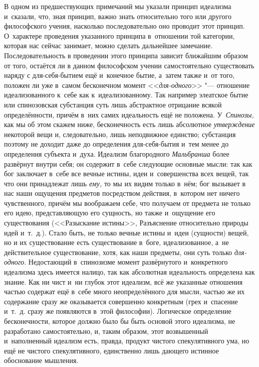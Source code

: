 В одном из предшествующих примечаний мы указали принцип идеализма и~сказали,
что, зная принцип, важно знать относительно того или другого философского
учения, насколько последовательно оно проводит этот принцип. О~характере
проведения указанного принципа в~отношении той категории, которая нас
сейчас занимает, можно сделать дальнейшее замечание. Последовательность в
проведении этого принципа зависит ближайшим образом от того, остаётся ли в
данном философском учении самостоятельно существовать наряду с
для-себя-бытием ещё и~конечное бытие, а~затем также и~от того, положен ли
уже в~самом бесконечном момент <<{\em для-одного}>>
"--- отношение идеализованного к~себе как к~идеализованному. Так например
элеатское бытие или спинозовская субстанция суть лишь абстрактное отрицание
всякой определённости, причём в~них самих идеальность ещё не положена.
У~{\em Спинозы,} как мы об этом скажем ниже,
бесконечность есть лишь абсолютное {\em утверждение}
некоторой вещи и, следовательно, лишь неподвижное единство; субстанция
поэтому не доходит даже до определения для-себя-бытия и~тем менее до
определения субъекта и~духа. Идеализм благородного
{\em Мальбранша} более развёрнут внутри себя; он
содержит в~себе следующие основные мысли: так как бог заключает в~себе все
вечные истины, идеи и~совершенства всех вещей, так что они принадлежат лишь
{\em ему,} то мы их видим только в~нём; бог вызывает в
нас наши ощущения предметов посредством действия, в~котором нет ничего
чувственного, причём мы воображаем себе, что получаем от предмета не только
его идею, представляющую его сущность, но также и~ощущение его
существования (<<Разыскание истины>>, Разъяснение относительно природы идей
и~т.~д.). Стало быть, не только вечные истины и~идеи (сущности) вещей, но и
их существование есть существование в~боге, идеализованное, а~не
действительное существование, хотя, как наши предметы, они суть только
{\em для-одного}. Недостающий в~спинозизме момент
развёрнутого и~конкретного идеализма здесь имеется налицо, так как
абсолютная идеальность определена как знание. Как ни чист и~ни глубок этот
идеализм, всё же указанные отношения частью содержат ещё в~себе много
неопределённого для мысли, частью же их содержание сразу же оказывается
совершенно конкретным (грех и~спасение и~т.~д. сразу же появляются в~этой
философии). Логическое определение бесконечности, которое должно было бы
быть основой этого идеализма, не разработано самостоятельно, и, таким
образом, этот возвышенный и~наполненный идеализм есть, правда, продукт
чистого спекулятивного ума, но ещё не чистого спекулятивного, единственно
лишь дающего истинное обоснование мышления.

